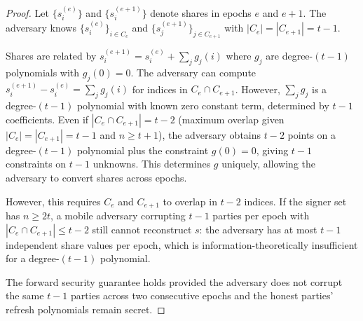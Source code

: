 \begin{proof}
Let $\{s_i^{(e)}\}$ and $\{s_i^{(e+1)}\}$ denote shares in epochs $e$ and $e+1$.
The adversary knows $\{s_i^{(e)}\}_{i \in C_e}$ and $\{s_j^{(e+1)}\}_{j \in C_{e+1}}$
with $|C_e| = |C_{e+1}| = t-1$.

Shares are related by $s_i^{(e+1)} = s_i^{(e)} + \sum_j g_j(i)$ where $g_j$ are
degree-$(t-1)$ polynomials with $g_j(0) = 0$. The adversary can compute
$s_i^{(e+1)} - s_i^{(e)} = \sum_j g_j(i)$ for indices in $C_e \cap C_{e+1}$.
However, $\sum_j g_j$ is a degree-$(t-1)$ polynomial with known zero constant term,
determined by $t-1$ coefficients. Even if $|C_e \cap C_{e+1}| = t-2$ (maximum overlap
given $|C_e| = |C_{e+1}| = t-1$ and $n \geq t+1$), the adversary obtains $t-2$ points
on a degree-$(t-1)$ polynomial plus the constraint $g(0) = 0$, giving $t-1$
constraints on $t-1$ unknowns. This determines $g$ uniquely, allowing the adversary
to convert shares across epochs.

However, this requires $C_e$ and $C_{e+1}$ to overlap in $t-2$ indices. If the signer
set has $n \geq 2t$, a mobile adversary corrupting $t-1$ parties per epoch with
$|C_e \cap C_{e+1}| \leq t-2$ still cannot reconstruct $s$: the adversary has at most
$t-1$ independent share values per epoch, which is information-theoretically
insufficient for a degree-$(t-1)$ polynomial.

The forward security guarantee holds provided the adversary does not corrupt the same
$t-1$ parties across two consecutive epochs and the honest parties' refresh polynomials
remain secret.
\end{proof}

